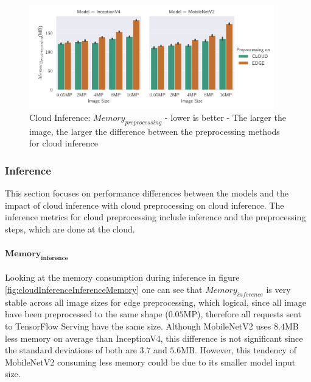 \begin{figure}[!htb]
\centering
\includegraphics[width=0.95\textwidth]{./Bilder/single_plots/cloud_inference_plots/Cloud_Inference_Preprocessing_Memory.pdf}
\caption[Cloud Inference:  $Memory_{preprocessing}$ - lower is better]{Cloud Inference:  $Memory_{preprocessing}$ - lower is better - The larger the image, the larger the difference between the preprocessing methods for cloud inference}
\label{fig:cloudInferencePreproMemory}
\end{figure}

\FloatBarrier
\subsubsection{Inference}
This section focuses on performance differences between the models and the impact of cloud inference with cloud preprocessing on cloud inference.
The inference metrics for cloud preprocessing include inference and the preprocessing steps, which are done at the cloud.

\paragraph{$\mathbf{Memory_{inference}}$}
Looking at the memory consumption during inference in figure \ref{fig:cloudInferenceInferenceMemory} one can see that $Memory_{inference}$ is very stable across all image sizes for edge preprocessing, which logical, since all image have been preprocessed to the same shape ($0.05$MP), therefore all requests sent to TensorFlow Serving have the same size.
Although MobileNetV2 uses $8.4$MB less memory on average than InceptionV4, this difference is not significant since the standard deviations of both are $3.7$ and $5.6$MB.
However, this tendency of MobileNetV2 consuming less memory could be due to its smaller model input size.

